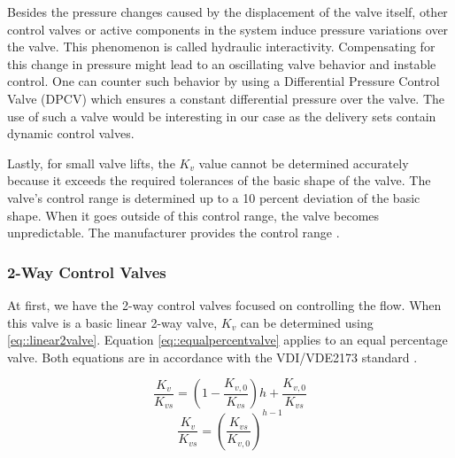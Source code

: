 Besides the pressure changes caused by the displacement of the valve itself, other control valves or active components in the system induce pressure variations over the valve. This phenomenon is called hydraulic interactivity. Compensating for this change in pressure might lead to an oscillating valve behavior and instable control. One can counter such behavior by using a Differential Pressure Control Valve (DPCV) which ensures a constant differential pressure over the valve. The use of such a valve would be interesting in our case as the delivery sets contain dynamic control valves.

Lastly, for small valve lifts, the $K_v$ value cannot be determined accurately because it exceeds the required tolerances of the basic shape of the valve. The valve's control range is determined up to a 10 percent deviation of the basic shape. When it goes outside of this control range, the valve becomes unpredictable. The manufacturer provides the control range \cite{echtephdthesis}.

\subsubsection{2-Way Control Valves}
At first, we have the 2-way control valves focused on controlling the flow. When this valve is a basic linear 2-way valve, $K_v$ can be determined using \ref{eq::linear2valve}. Equation  \ref{eq::equalpercentvalve} applies to an equal percentage valve. Both equations are in accordance with the VDI/VDE2173 standard \cite{VDI/VDE2713}. 

\begin{equation}\label{eq::linear2valve}
    \frac{K_v}{K_{vs}} = \left( 1 -\frac{K_{v,0}}{K_{vs}} \right) h + \frac{K_{v,0}}{K_{vs}}
\end{equation}
\begin{equation}\label{eq::equalpercentvalve}
    \frac{K_v}{K_{vs}} = {\left(\frac{K_{vs}}{K_{v,0}} \right)}^{h - 1}
\end{equation}

